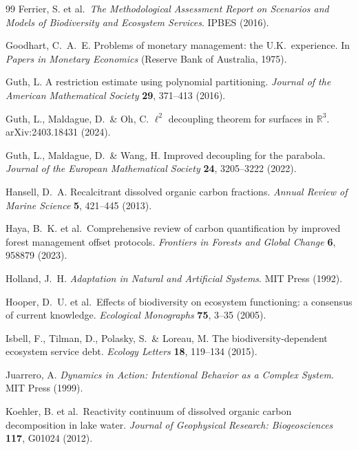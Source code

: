 \documentclass[12pt]{article}
\begin{document}
\begin{thebibliography}{99}
Ferrier, S. et al.\ \textit{The Methodological Assessment Report on Scenarios and Models of Biodiversity and Ecosystem Services}. IPBES (2016).

Goodhart, C.~A.~E. Problems of monetary management: the U.K.\ experience. In \textit{Papers in Monetary Economics} (Reserve Bank of Australia, 1975).

Guth, L. A restriction estimate using polynomial partitioning. \textit{Journal of the American Mathematical Society} \textbf{29}, 371--413 (2016).

Guth, L., Maldague, D.\ \& Oh, C. $\ell^2$ decoupling theorem for surfaces in $\mathbb{R}^3$. arXiv:2403.18431 (2024).

Guth, L., Maldague, D.\ \& Wang, H. Improved decoupling for the parabola. \textit{Journal of the European Mathematical Society} \textbf{24}, 3205--3222 (2022).

Hansell, D.~A. Recalcitrant dissolved organic carbon fractions. \textit{Annual Review of Marine Science} \textbf{5}, 421--445 (2013).

Haya, B.~K. et al.\ Comprehensive review of carbon quantification by improved forest management offset protocols. \textit{Frontiers in Forests and Global Change} \textbf{6}, 958879 (2023).

Holland, J.~H. \textit{Adaptation in Natural and Artificial Systems}. MIT Press (1992).

Hooper, D.~U. et al.\ Effects of biodiversity on ecosystem functioning: a consensus of current knowledge. \textit{Ecological Monographs} \textbf{75}, 3--35 (2005).

Isbell, F., Tilman, D., Polasky, S.\ \& Loreau, M. The biodiversity-dependent ecosystem service debt. \textit{Ecology Letters} \textbf{18}, 119--134 (2015).

Juarrero, A. \textit{Dynamics in Action: Intentional Behavior as a Complex System}. MIT Press (1999).

Koehler, B. et al.\ Reactivity continuum of dissolved organic carbon decomposition in lake water. \textit{Journal of Geophysical Research: Biogeosciences} \textbf{117}, G01024 (2012).


\end{thebibliography}
\end{document}
